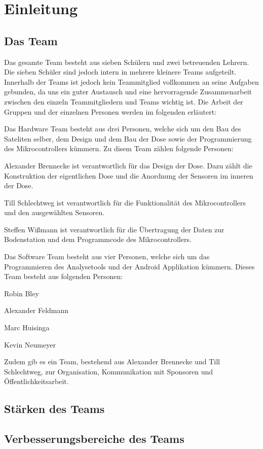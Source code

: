 \section{Einleitung}
\subsection{Das Team}

Das gesamte Team besteht aus sieben Schülern und zwei betreuenden Lehrern. Die sieben Schüler sind jedoch intern in mehrere kleinere Teams aufgeteilt. Innerhalb der Teams ist jedoch kein Teammitglied vollkommen an seine Aufgaben gebunden, da uns ein guter Austausch und eine hervorragende Zusammenarbeit zwischen den einzeln Teammitgliedern und Teams wichtig ist. Die Arbeit der Gruppen und der einzelnen Personen werden im folgenden erläutert:

Das Hardware Team besteht aus drei Personen, welche sich um den Bau des Sateliten selber, dem Design und dem Bau der Dose sowie der Programmierung des Mikrocontrollers kümmern. Zu disem Team zählen folgende Personen:

Alexander Brennecke ist verantwortlich für das Design der Dose. Dazu zählt die Konstruktion der eigentlichen Dose und die Anordnung der Sensoren im inneren der Dose.

Till Schlechtweg ist verantwortlich für die Funktionalität des Mikrocontrollers und den ausgewählten Sensoren.

Steffen Wißmann ist verantwortlich für die Übertragung der Daten zur Bodenstation und dem Programmcode des Mikrocontrollers.

Das Software Team besteht aus vier Personen, welche sich um das Programmieren des Analysetools und der Android Applikation kümmern. Dieses Team besteht aus folgenden Personen:

Robin Bley

Alexander Feldmann

Marc Huisinga

Kevin Neumeyer

Zudem gib es ein Team, bestehend aus Alexander Brennecke und Till Schlechtweg, zur Organisation, Kommunikation mit Sponsoren und Öffentlichkeitsarbeit.

\subsection{Stärken des Teams}

\subsection{Verbesserungsbereiche des Teams}

